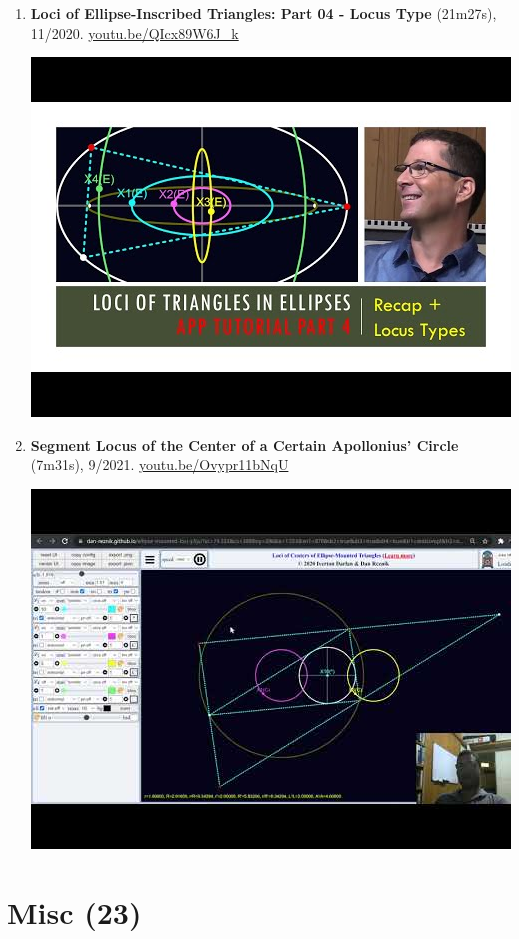\documentclass[12pt]{article}
\begin{document}
\begin{enumerate}[resume]
% 
\item \textbf{Loci of Ellipse-Inscribed Triangles: Part 04 - Locus Type} (21m27s), 11/2020. \href{https://youtu.be/QIcx89W6J_k}{\url{youtu.be/QIcx89W6J\_k}}
\begin{center}\includegraphics[width=.5\textwidth]{pics/QIcx89W6J_k.jpg}\end{center}
% 
\item \textbf{Segment Locus of the Center of a Certain Apollonius' Circle} (7m31s), 9/2021. \href{https://youtu.be/Ovypr11bNqU}{\url{youtu.be/Ovypr11bNqU}}
\begin{center}\includegraphics[width=.5\textwidth]{pics/Ovypr11bNqU.jpg}\end{center}
% 
\end{enumerate}

\section{Misc (23)}
\end{document}
